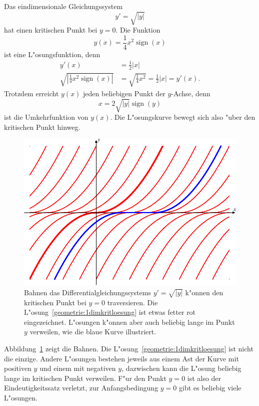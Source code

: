 \begin{beispiel}
Das eindimensionale Gleichungssystem
\[
y'=\sqrt{|y|}
\]
hat einen kritischen Punkt bei $y=0$.
Die Funktion
\begin{equation}
y(x)=\frac14x^2\operatorname{sign}(x)
\label{geometrie:1dimkritloesung}
\end{equation}
ist eine L"osungsfunktion, denn
\begin{align*}
y'(x)&=\frac12|x|\\
\sqrt{\left|\frac14x^2\operatorname{sign}(x)\right|}
&=
\sqrt{\frac14x^2}
=
\frac12|x|=y'(x).
\end{align*}
Trotzdem erreicht $y(x)$ jeden beliebigen Punkt der $y$-Achse, denn 
\[
x=2\sqrt{|y|}\operatorname{sign}(y)
\]
ist die Umkehrfunktion von $y(x)$. 
Die L"osungskurve bewegt sich also "uber den kritischen Punkt hinweg.
\begin{figure}
\centering
\includegraphics{chapters/images/geometrie-1.pdf}
\caption{Bahnen das Differentialgleichungssystems $y'=\sqrt{|y|}$
k"onnen den kritischen Punkt bei $y=0$ traversieren.
Die L"osung~\eqref{geometrie:1dimkritloesung} ist etwas fetter rot
eingezeichnet.
L"osungen k"onnen aber auch beliebig lange im Punkt $y$ verweilen,
wie die blaue Kurve illustriert.
\label{geometrie:1dimkrit}}
\end{figure}
Abbildung~\ref{geometrie:1dimkrit} zeigt die Bahnen.
Die L"osung~\eqref{geometrie:1dimkritloesung} ist nicht die einzige.
Andere L"osungen bestehen jeweils aus einem Ast der Kurve mit positiven
$y$ und einem mit negativen $y$, dazwischen kann die L"osung beliebig lange
im kritischen Punkt verweilen.
F"ur den Punkt $y=0$ ist also der Eindeutigkeitssatz verletzt, zur
Anfangsbedingung $y=0$ gibt es beliebig viele L"osungen.
\end{beispiel}

